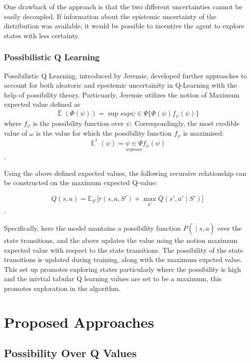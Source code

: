\documentclass[12pt,a4paper]{report}
\DeclareMathOperator{\EX}{\mathbb{E}}
\begin{document}
One drawback of the approach is that the two different uncertainties cannot be easily decoupled. If information about the epistemic uncertainty of the distribution was available, it would be possible to incentive the agent to explore states with less certainty. 

\subsection{Possibilistic Q Learning}
 
Possibilistic Q Learning, introduced by Jeremie, developed further approaches to account for both aleatoric and epestemic uncertainity in Q-Learning with the help of possibility theory. Particuarly, Jeremie utilizes the notion of Maximum expected value defined as 
\[
  \bar{\EX} (\Phi(\psi)) = \sup{sup}{\psi \in \Psi} \{\Phi(\psi) f_\psi(\psi)\}
\]where $f_\psi$ is the possibility function over $\psi$. 
Correspondingly, the most credible value of $\omega$ is the value for which the possibility function $f_\psi$ is maximised: 
\[
  \EX^* (\psi) = \underset{argmax}{\psi \in \Psi} f_\psi(\psi)
\]. 
\par 

Using the above defined expected values, the following recursive relationship can be constructed on the maximum expected Q-value:

\[
Q(s,a) = \mathbb{E}_{S'}\Big[\bar{r}(s,a,S') + \max_{a'} \bar{Q}(s', a' \mid S') \Big]
\]. 

Specifically, here the model mantains a possibility function $P(\dot \mid s, a)$ over the state transitions, and the above updates the value using the notion maximum expected value with respect to the state transitions. The possibility of the state transitions is updated during training, along with the maximum expcted value. This set up promotes exploring states particularly where the possibility is high and the inivtial tabular Q learning values are set to be a maximum, this promotes exploration in the algorithm. 







\chapter{Proposed Approaches}
\section{Possibility Over Q Values}
\end{document}
